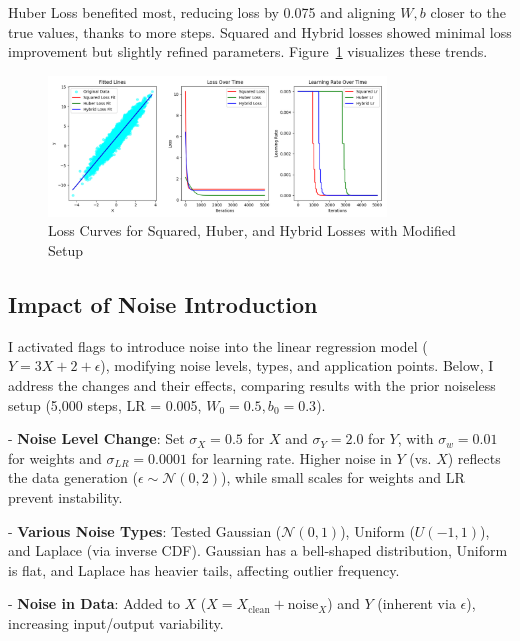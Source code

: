 \documentclass{article}
\begin{document}
Huber Loss benefited most, reducing loss by 0.075 and aligning \( W, b \) closer to the true values, thanks to more steps. Squared and Hybrid losses showed minimal loss improvement but slightly refined parameters. Figure~\ref{fig:patience_curves} visualizes these trends.

\begin{figure}[H]
    \centering
    \includegraphics[width=0.8\textwidth]{assets/patience.png}
    \caption{Loss Curves for Squared, Huber, and Hybrid Losses with Modified Setup}
    \label{fig:patience_curves}
\end{figure}

\subsection{Impact of Noise Introduction}

I activated flags to introduce noise into the linear regression model (\( Y = 3X + 2 + \epsilon \)), modifying noise levels, types, and application points. Below, I address the changes and their effects, comparing results with the prior noiseless setup (5,000 steps, LR = 0.005, \( W_0 = 0.5, b_0 = 0.3 \)).

- \textbf{Noise Level Change}: Set \( \sigma_X = 0.5 \) for \( X \) and \( \sigma_Y = 2.0 \) for \( Y \), with \( \sigma_w = 0.01 \) for weights and \( \sigma_{LR} = 0.0001 \) for learning rate. Higher noise in \( Y \) (vs. \( X \)) reflects the data generation (\( \epsilon \sim \mathcal{N}(0, 2) \)), while small scales for weights and LR prevent instability.

- \textbf{Various Noise Types}: Tested Gaussian (\( \mathcal{N}(0, 1) \)), Uniform (\( U(-1, 1) \)), and Laplace (via inverse CDF). Gaussian has a bell-shaped distribution, Uniform is flat, and Laplace has heavier tails, affecting outlier frequency.

- \textbf{Noise in Data}: Added to \( X \) (\( X = X_{\text{clean}} + \text{noise}_X \)) and \( Y \) (inherent via \( \epsilon \)), increasing input/output variability.
\end{document}
